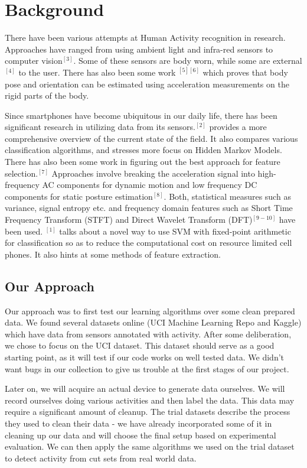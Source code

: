 \documentclass{article} %
\begin{document}
\section{Background}
There have been various attempts at Human Activity recognition in research. Approaches have ranged from using ambient light and infra-red sensors to computer vision$^{[3]}$. Some of these sensors are body worn, while some are external$^{[4]}$ to the user. There has also been some work $^{[5][6]}$ which proves that body pose and orientation can be estimated using acceleration measurements on the rigid parts of the body.

Since smartphones have become ubiquitous in our daily life, there has been significant research in utilizing data from its sensors.$^{[2]}$ provides a more comprehensive overview of the current state of the field. It also compares various classification algorithms, and stresses more focus on Hidden Markov Models. There has also been some work in figuring out the best approach for feature selection.$^{[7]}$ Approaches involve breaking the acceleration signal into high-frequency AC components for dynamic motion and low frequency DC components for static posture estimation$^{[8]}$. Both, statistical measures such as variance, signal entropy etc. and frequency domain features such as Short Time Frequency Transform (STFT) and Direct Wavelet Transform (DFT)$^{[9-10]}$ have been used. $^{[1]}$ talks about a novel way to use SVM with fixed-point arithmetic for classification so as to reduce the computational cost on resource limited cell phones. It also hints at some methods of feature extraction.

\subsection{Our Approach}
Our approach was to first test our learning algorithms over some clean prepared data. We found several datasets online (UCI Machine Learning Repo and Kaggle) which have data from sensors annotated with activity. After some deliberation, we chose to focus on the UCI dataset. This dataset should serve as a good starting point, as it will test if our code works on well tested data. We didn’t want bugs in our collection to give us trouble at the first stages of our project.

Later on, we will acquire an actual device to generate data ourselves. We will record ourselves doing various activities and then label the data. This data may require a significant amount of cleanup. The trial datasets describe the process they used to clean their data - we have already incorporated some of it in cleaning up our data and will choose the final setup based on experimental evaluation. We can then apply the same algorithms we used on the trial dataset to detect activity from cut sets from real world data. 
\end{document}
